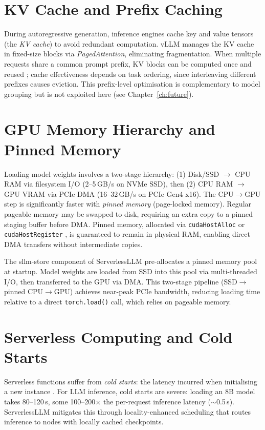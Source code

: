 \documentclass[logo,bsc,singlespacing,parskip,online]{infthesis}
\begin{document}
\section{KV Cache and Prefix Caching}
\label{sec:bg_kv_cache}

During autoregressive generation, inference engines cache key and value tensors (the \textit{KV cache}) to avoid redundant computation. vLLM \citep{kwon2023efficient} manages the KV cache in fixed-size blocks via \textit{PagedAttention}, eliminating fragmentation. When multiple requests share a common prompt prefix, KV blocks can be computed once and reused \citep{zheng2024sglang}; cache effectiveness depends on task ordering, since interleaving different prefixes causes eviction. This prefix-level optimisation is complementary to model grouping but is not exploited here (see Chapter~\ref{ch:future}).

\section{GPU Memory Hierarchy and Pinned Memory}
\label{sec:bg_pinned_memory}

Loading model weights involves a two-stage hierarchy: (1) Disk/SSD $\rightarrow$ CPU RAM via filesystem I/O (2--5\,GB/s on NVMe SSD), then (2) CPU RAM $\rightarrow$ GPU VRAM via PCIe DMA (16--32\,GB/s on PCIe Gen4 x16). The CPU$\rightarrow$GPU step is significantly faster with \textit{pinned memory} (page-locked memory). Regular pageable memory may be swapped to disk, requiring an extra copy to a pinned staging buffer before DMA. Pinned memory, allocated via \texttt{cudaHostAlloc} or \texttt{cudaHostRegister} \citep{cuda_guide2024}, is guaranteed to remain in physical RAM, enabling direct DMA transfers without intermediate copies.

The sllm-store component of ServerlessLLM \citep{fu2024serverlessllm} pre-allocates a pinned memory pool at startup. Model weights are loaded from SSD into this pool via multi-threaded I/O, then transferred to the GPU via DMA. This two-stage pipeline (SSD$\rightarrow$pinned CPU$\rightarrow$GPU) achieves near-peak PCIe bandwidth, reducing loading time relative to a direct \texttt{torch.load()} call, which relies on pageable memory.

\section{Serverless Computing and Cold Starts}

Serverless functions suffer from \textit{cold starts}: the latency incurred when initialising a new instance \citep{shahrad2020serverless}. For LLM inference, cold starts are severe: loading an 8B model takes 80--120\,s, some 100--200$\times$ the per-request inference latency ($\sim$0.5\,s). ServerlessLLM \citep{fu2024serverlessllm} mitigates this through locality-enhanced scheduling that routes inference to nodes with locally cached checkpoints.
\end{document}

